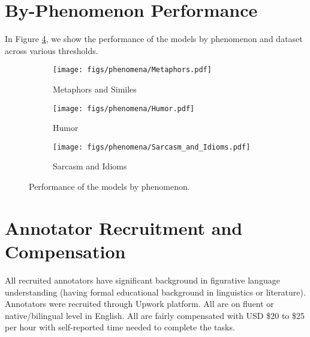 \section{By-Phenomenon Performance} \label{app:byPhen}

In Figure \ref{fig:byPhen}, we show the performance of the models by phenomenon and dataset across various thresholds.

\begin{figure}[htbp]
    \centering
    
    \begin{subfigure}[b]{\columnwidth}
        \centering
        \texttt{[image: figs/phenomena/Metaphors.pdf]}
        \caption{Metaphors and Similes}
        \label{fig:metaphors_similes}
    \end{subfigure}
    \hfill     \begin{subfigure}[b]{\columnwidth}
        \centering
        \texttt{[image: figs/phenomena/Humor.pdf]}
        \caption{Humor}
        \label{fig:humor}
    \end{subfigure}
    \hfill     \begin{subfigure}[b]{\columnwidth}
        \centering
        \texttt{[image: figs/phenomena/Sarcasm\_and\_Idioms.pdf]}
        \caption{Sarcasm and Idioms}
        \label{fig:sarcasm_idioms}
    \end{subfigure}

    \caption{Performance of the models by phenomenon.}
    \label{fig:byPhen}
\end{figure}

\section{Annotator Recruitment and Compensation}

All recruited annotators have significant background in figurative language understanding (having formal educational background in linguistics or literature). Annotators were recruited through Upwork platform. All are on fluent or native/bilingual level in English. All are fairly compensated with USD \$20 to \$25 per hour with self-reported time needed to complete the tasks.


